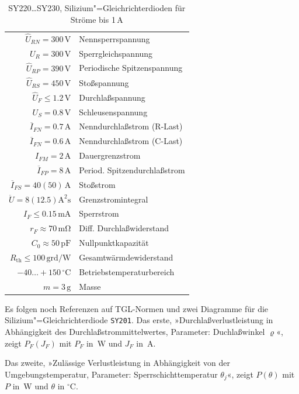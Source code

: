 \documentclass[a4paper,10pt,fleqn,twocolumn,twoside,dvipdfmx]{scrartcl}
\numberwithin{equation}{section}
\begin{document}
\begin{table}[t]
\begin{tabular}{rl}
\toprule
$\hat U_{RN} = 300\,\mathrm{V}$ & Nennsperrspannung\\
$U_R = 300\,\mathrm{V}$ & Sperrgleichspannung\\
$\hat U_{RP} = 390\,\mathrm{V}$ & Periodische Spitzenspannung\\
$\hat U_{RS} = 450\,\mathrm{V}$ & Stoßspannung\\
\midrule
$\hat U_F \le 1.2\,\mathrm{V}$ & Durchlaßspannung\\
$U_S = 0.8\,\mathrm{V}$ & Schleusenspannung\\
$\overline I_{FN} = 0.7\,\mathrm{A}$
  & Nenndurchlaßstrom (R-Last)\\
$\overline I_{FN} = 0.6\,\mathrm{A}$
  & Nenndurchlaßstrom (C-Last)\\
\midrule
$I_{FM} = 2\,\mathrm{A}$ & Dauergrenzstrom\\
$\overline I_{FP}=8\,\mathrm{A}$
  & Period. Spitzendurchlaßstrom\\
$\overline I_{FS}=40(50)\,\mathrm{A}$
  & Stoßstrom\\
$\ddot U = 8(12.5)\mathrm{A^2 s}$
  & Grenzstromintegral\\
\midrule
$I_F \le 0.15\,\mathrm{mA}$ & Sperrstrom\\
$r_F \approx 70\,\mathrm{m\Omega}$
  & Diff. Durchlaßwiderstand\\
$C_0 \approx 50\,\mathrm{pF}$
  & Nullpunktkapazität\\
$R_{\mathrm{th}}{\le}100\,\mathrm{grd/W}$
  & Gesamtwärmdewiderstand\\
\midrule
$-40{\ldots}{+}150\,\mathrm{{}^\circ C}$
  & Betriebstemperaturbereich\\
$m=3\,\mathrm{g}$ & Masse\\
\bottomrule
\end{tabular}
\caption{SY220{\ldots}SY230, Silizium"=Gleichrichterdioden
für Ströme bis 1\,A}
\label{table:SY}
\end{table}
Es folgen noch Referenzen auf TGL-Normen und
zwei Diagramme für die Silizium"=Gleichrichterdiode \texttt{SY201}.
Das erste, »Durchlaßverlustleistung in Abhängigkeit des
Durchlaßstrommittelwertes, Parameter: Duchlaßwinkel
$\varrho$«, zeigt  $P_F(J_F)$ mit $P_F$ in~W und $J_F$ in~A.

Das zweite, »Zulässige Verlustleistung
in Abhängigkeit von der Umgebungstemperatur, Parameter:
Sperrschichttemperatur $\theta_j$«, zeigt $P(\theta)$
mit $P$ in~W und $\theta$ in ${}^\circ\mathrm{C}$.
\end{document}
